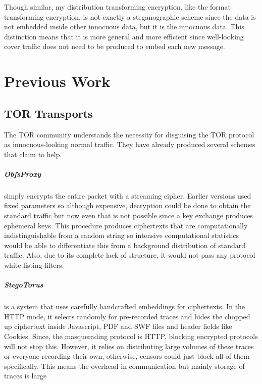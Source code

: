 \documentclass[ %
                    author={Samuel Russell},
                supervisor={Prof. Bogdan Warinschi},
                    degree={MEng},
                     title={Innocuous Ciphertexts},
                  subtitle={The DE-CENSOR Scheme},
                      type={Research},
                      year={2018} ]{dissertation}
\begin{document}
Though similar, my distribution transforming encryption, like the format transforming encryption, is not exactly a steganographic scheme since the data is not embedded inside other innocuous data, but it is the innocuous data. This distinction means that it is more general and more efficient since well-looking cover traffic does not need to be produced to embed each new message.


\chapter{Previous Work}\label{chap:prev_work}

\section{TOR Transports}

The TOR community understands the necessity for disguising the TOR protocol as innocuous-looking normal traffic.
They have already produced several schemes that claim to help.

\paragraph{ObfsProxy} simply encrypts the entire packet with a streaming cipher. Earlier versions used fixed parameters so although expensive, decryption could be done to obtain the standard traffic but now even that is not possible since a key exchange produces ephemeral keys. This procedure produces ciphertexts that are computationally indistinguishable from a random string so intensive computational statistics would be able to differentiate this from a background distribution of standard traffic. Also, due to its complete lack of structure, it would not pass any protocol white-listing filters.

\paragraph{StegoTorus} is a system that uses carefully handcrafted embeddings for ciphertexts. In the HTTP mode, it selects randomly for pre-recorded traces and hides the chopped up ciphertext inside Javascript, PDF and SWF files and header fields like Cookies. Since, the masquerading protocol is HTTP, blocking encrypted protocols will not stop this. However, it relies on distributing large volumes of these traces or everyone recording their own, otherwise, censors could just block all of them specifically. This means the overhead in communication but mainly storage of traces is large
\end{document}

